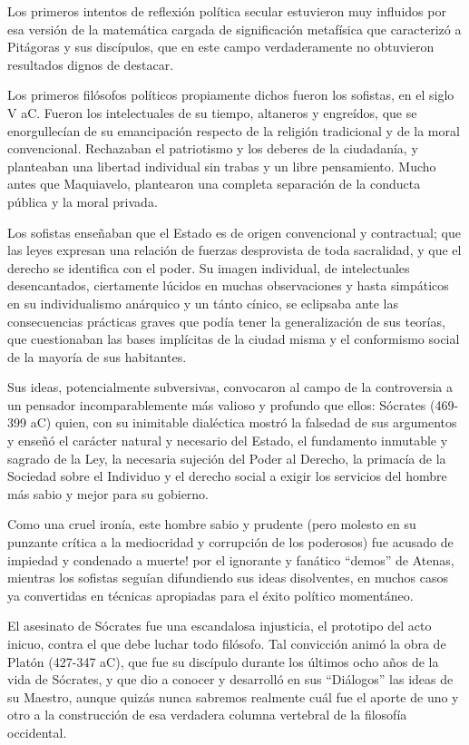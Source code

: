 \documentclass[
]{book}
\begin{document}
Los primeros intentos de reflexión política secular estuvieron muy influidos por esa versión de la matemática cargada de significación metafísica que caracterizó a Pitágoras y sus discípulos, que en este campo verdaderamente no obtuvieron resultados dignos de destacar.

Los primeros filósofos políticos propiamente dichos fueron los sofistas, en el siglo V aC. Fueron los intelectuales de su tiempo, altaneros y engreídos, que se enorgullecían de su emancipación respecto de la religión tradicional y de la moral convencional. Rechazaban el patriotismo y los deberes de la ciudadanía, y planteaban una libertad individual sin trabas y un libre pensamiento. Mucho antes que Maquiavelo, plantearon una completa separación de la conducta pública y la moral privada.

Los sofistas enseñaban que el Estado es de origen convencional y contractual; que las leyes expresan una relación de fuerzas desprovista de toda sacralidad, y que el derecho se identifica con el poder. Su imagen individual, de intelectuales desencantados, ciertamente lúcidos en muchas observaciones y hasta simpáticos en su individualismo anárquico y un tánto cínico, se eclipsaba ante las consecuencias prácticas graves que podía tener la generalización de sus teorías, que cuestionaban las bases implícitas de la ciudad misma y el conformismo social de la mayoría de sus habitantes.

Sus ideas, potencialmente subversivas, convocaron al campo de la controversia a un pensador incomparablemente más valioso y profundo que ellos: Sócrates (469-399 aC) quien, con su inimitable dialéctica mostró la falsedad de sus argumentos y enseñó el carácter natural y necesario del Estado, el fundamento inmutable y sagrado de la Ley, la necesaria sujeción del Poder al Derecho, la primacía de la Sociedad sobre el Individuo y el derecho social a exigir los servicios del hombre más sabio y mejor para su gobierno.

Como una cruel ironía, este hombre sabio y prudente (pero molesto en su punzante crítica a la mediocridad y corrupción de los poderosos) fue acusado de impiedad y condenado a muerte! por el ignorante y fanático ``demos'' de Atenas, mientras los sofistas seguían difundiendo sus ideas disolventes, en muchos casos ya convertidas en técnicas apropiadas para el éxito político momentáneo.

El asesinato de Sócrates fue una escandalosa injusticia, el prototipo del acto inicuo, contra el que debe luchar todo filósofo. Tal convicción animó la obra de Platón (427-347 aC), que fue su discípulo durante los últimos ocho años de la vida de Sócrates, y que dio a conocer y desarrolló en sus ``Diálogos'' las ideas de su Maestro, aunque quizás nunca sabremos realmente cuál fue el aporte de uno y otro a la construcción de esa verdadera columna vertebral de la filosofía occidental.
\end{document}
